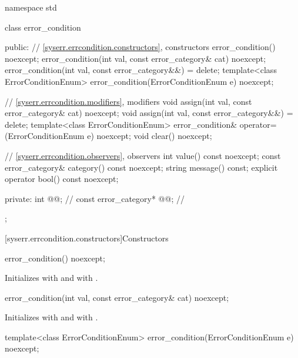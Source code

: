 %
\begin{codeblock}
namespace std {
  class error_condition {
  public:
    // \ref{syserr.errcondition.constructors}, constructors
    error_condition() noexcept;
    error_condition(int val, const error_category& cat) noexcept;
    error_condition(int val, const error_category&&) = delete;
    template<class ErrorConditionEnum>
      error_condition(ErrorConditionEnum e) noexcept;

    // \ref{syserr.errcondition.modifiers}, modifiers
    void assign(int val, const error_category& cat) noexcept;
    void assign(int val, const error_category&&) = delete;
    template<class ErrorConditionEnum>
      error_condition& operator=(ErrorConditionEnum e) noexcept;
    void clear() noexcept;

    // \ref{syserr.errcondition.observers}, observers
    int value() const noexcept;
    const error_category& category() const noexcept;
    string message() const;
    explicit operator bool() const noexcept;

  private:
    int @@;                   // \expos
    const error_category* @@; // \expos
  };
}
\end{codeblock}

[syserr.errcondition.constructors]{Constructors}

%
\begin{itemdecl}
error_condition() noexcept;
\end{itemdecl}

\begin{itemdescr}
\pnum
\effects
Initializes  with 
and  with .
\end{itemdescr}

%
\begin{itemdecl}
error_condition(int val, const error_category& cat) noexcept;
\end{itemdecl}

\begin{itemdescr}
\pnum
\effects
Initializes  with 
and  with .
\end{itemdescr}

%
\begin{itemdecl}
template<class ErrorConditionEnum>
  error_condition(ErrorConditionEnum e) noexcept;
\end{itemdecl}

